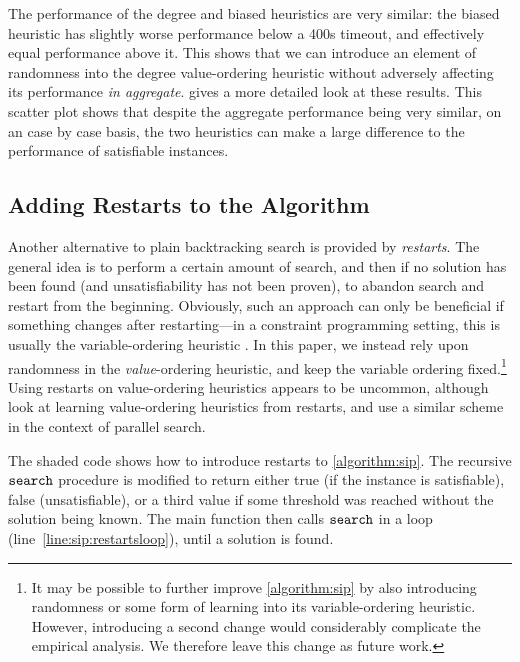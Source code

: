 \documentclass{article}
\newcommand{\citet}[1]{\citeauthor{#1} \shortcite{#1}}
\newcommand{\citep}[1]{\cite{#1}}
\newcommand{\siplineref}[1]{line~\ref{line:sip:#1}}
\begin{document}
The performance of the degree and biased heuristics are very similar: the
biased heuristic has slightly worse performance below a 400s timeout, and effectively equal
performance above it. This shows that we can introduce an element of randomness into the degree
value-ordering heuristic without adversely affecting its performance \emph{in aggregate}.
 gives a more detailed look at these results. This scatter plot
shows that despite the aggregate performance being very similar, on an case by case basis, the two
heuristics can make a large difference to the performance of satisfiable instances.

\subsection{Adding Restarts to the Algorithm}

Another alternative to plain backtracking search is provided by \emph{restarts}. The general idea is
to perform a certain amount of search, and then if no solution has been found (and unsatisfiability
has not been proven), to abandon search and restart from the beginning. Obviously, such an approach
can only be beneficial if something changes after restarting---in a constraint programming setting,
this is usually the variable-ordering heuristic
\citep{DBLP:journals/jsat/LecoutreSTV07,DBLP:conf/cp/GayHLS15,DBLP:conf/aaai/LeeSZ16,DBLP:conf/cp/GlorianBLLM17}.
In this paper, we instead rely upon randomness in the \emph{value}-ordering heuristic, and keep the
variable ordering fixed.\footnote{It may be possible to further improve \cref{algorithm:sip} by also
introducing randomness or some form of learning into its variable-ordering heuristic. However,
introducing a second change would considerably complicate the empirical analysis. We therefore leave
this change as future work.} Using restarts on value-ordering heuristics appears to be uncommon,
although \citet{DBLP:conf/flairs/RazgonOP07} look at learning value-ordering heuristics from
restarts, and \citet{DBLP:conf/cp/ChuSS09} use a similar scheme in the context of parallel search.

The shaded code shows how to introduce restarts to \cref{algorithm:sip}. The recursive
$\FuncSty{search}$ procedure is modified to return either true (if the instance is satisfiable),
false (unsatisfiable), or a third value if some threshold was reached without the solution being
known.  The main function then calls $\FuncSty{search}$ in a loop (\siplineref{restartsloop}), until
a solution is found.
\end{document}
